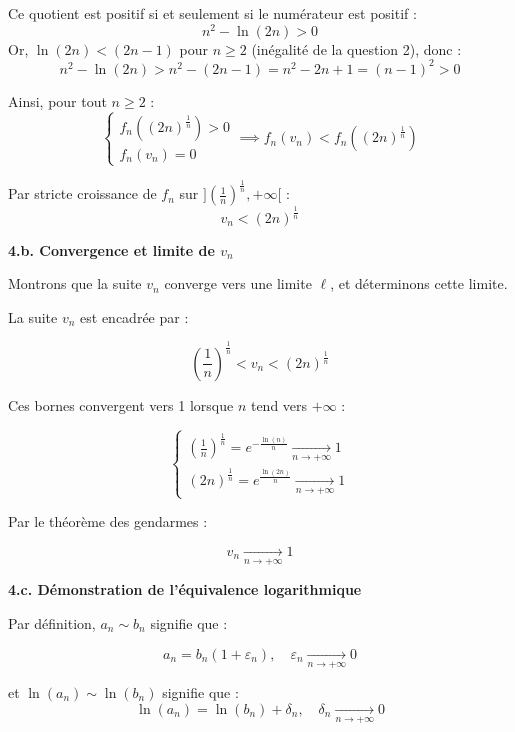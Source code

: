 \documentclass[10pt,a4paper]{article}
\begin{document}
Ce quotient est positif si et seulement si le numérateur est positif :
\[
    n^2 - \ln(2n) > 0
\]
Or, \( \ln(2n) < (2n - 1)\) pour \( n \geq 2 \) (inégalité de la question 2), donc :
\[
    n^2 - \ln(2n) > n^2 - (2n - 1) = n^2 - 2n + 1 = (n-1)^2 > 0
\]

Ainsi, pour tout \( n \geq 2 \) :
\[
\begin{cases}
    f_n \left((2n)^{\frac{1}{n}}\right) > 0 \\
    f_n(v_n) = 0
\end{cases}
\implies f_n(v_n) < f_n \left((2n)^{\frac{1}{n}}\right)
\]

Par stricte croissance de \( f_n \) sur \( ]\left(\frac{1}{n}\right)^{\frac{1}{n}}, +\infty[ \) :
\[
    v_n < (2n)^{\frac{1}{n}}
\]


\bigskip
\textbf{4.b. Convergence et limite de \( v_n \)}

Montrons que la suite \( v_n \) converge vers une limite \( \ell \), et déterminons cette limite.

La suite \( v_n \) est encadrée par :

\[
    \left(\frac{1}{n}\right)^{\frac{1}{n}} < v_n < (2n)^{\frac{1}{n}}
\]

Ces bornes convergent vers 1 lorsque \( n \) tend vers \( +\infty \) :

\[
\begin{cases}
\left(\frac{1}{n}\right)^{\frac{1}{n}} = e^{-\frac{\ln(n)}{n}} \underset{n \to +\infty}{\longrightarrow} 1 \\
(2n)^{\frac{1}{n}} = e^{\frac{\ln(2n)}{n}} \underset{n \to +\infty}{\longrightarrow} 1
\end{cases}
\]

Par le théorème des gendarmes :

\[
    v_n \underset{n \to +\infty}{\longrightarrow} 1
\]


\bigskip
\textbf{4.c. Démonstration de l'équivalence logarithmique}

Par définition, \( a_n \sim b_n \) signifie que :

\[
    a_n = b_n (1 + \varepsilon_n), \quad \varepsilon_n \underset{n \to +\infty}{\longrightarrow} 0
\]

et \( \ln(a_n) \sim \ln(b_n) \) signifie que :
\[
    \ln(a_n) = \ln(b_n) + \delta_n, \quad \delta_n \underset{n \to +\infty}{\longrightarrow} 0
\]
\end{document}
